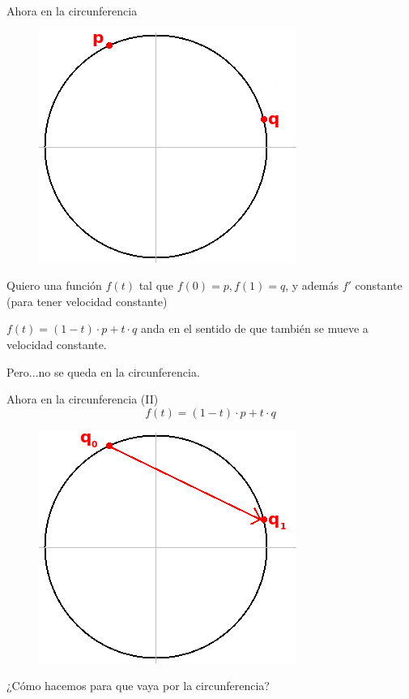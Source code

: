 \documentclass[10pt]{beamer}
\begin{document}
\begin{frame}{Ahora en la circunferencia}


\begin{figure}  		
  	\centering
	\includegraphics[scale=0.5]{slerpR2_p.png}
\end{figure}

Quiero una función $f(t)$ tal que $f(0) = p, f(1) = q$, y además $f'$ constante (para tener velocidad constante)

$f(t) = (1-t) \cdot p + t\cdot q$ anda en el sentido de que también se mueve a velocidad constante.

Pero...no se queda en la circunferencia.



\end{frame}


\begin{frame}{Ahora en la circunferencia (II)} %
$$f(t) = (1-t)\cdot p + t\cdot q$$

\begin{figure}  		
  	\centering
	\includegraphics[scale=0.5]{slerpR2_2_p.png}
\end{figure} 

¿Cómo hacemos para que vaya por la circunferencia? 

\end{frame}
\end{document}
